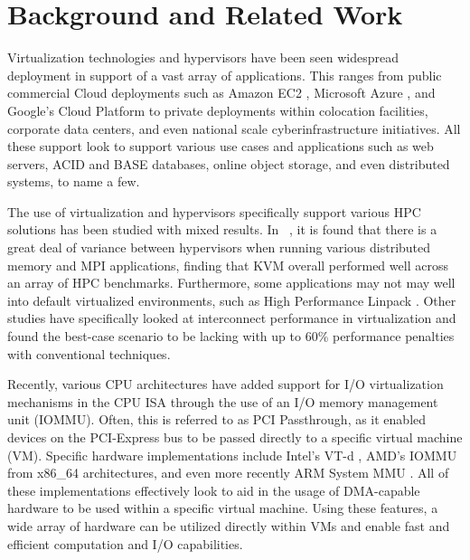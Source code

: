 \documentclass{sigplanconf}
\begin{document}
\section{Background and Related Work}


Virtualization technologies and hypervisors have been seen widespread deployment in support of a vast array of applications.  This ranges from public commercial Cloud deployments such as Amazon EC2 \cite{hazelhurst2008scientific,amazon2010}, Microsoft Azure \cite{jennings2010cloud}, and Google's Cloud Platform \cite{www-google-platform} to private deployments within colocation facilities, corporate data centers, and even national scale cyberinfrastructure initiatives.  All these support look to support various use cases and applications such as web servers, ACID and BASE databases, online object storage, and even distributed systems, to name a few.  

The use of virtualization and hypervisors specifically support various HPC solutions has been studied with mixed results.  In ~\cite{Younge2011cloud}, it is found that there is a great deal of variance between hypervisors when running various distributed memory and MPI applications, finding that KVM overall performed well across an array of HPC benchmarks.  Furthermore, some applications may not may well into default virtualized environments, such as High Performance Linpack \cite{Luszczek:2011:EHC}. Other studies have specifically looked at interconnect performance in virtualization and found the best-case scenario to be lacking \cite{Ramakrishnan2012} with up to 60\% performance penalties with conventional techniques.
 
Recently, various CPU architectures have added support for I/O virtualization mechanisms in the CPU ISA through the use of an I/O memory management unit (IOMMU). Often, this is referred to as PCI Passthrough, as it enabled devices on the PCI-Express bus to be passed directly to a specific virtual machine (VM).  Specific hardware implementations include Intel's VT-d \cite{intelvirtualization}, AMD's IOMMU \cite{amdiommu} from x86\_64 architectures, and even more recently ARM System MMU \cite{armmmu}.  All of these implementations effectively look to aid in the usage of DMA-capable hardware to be used within a specific virtual machine. Using these features, a wide array of hardware can be utilized directly within VMs and enable fast and efficient computation and I/O capabilities.
\end{document}
